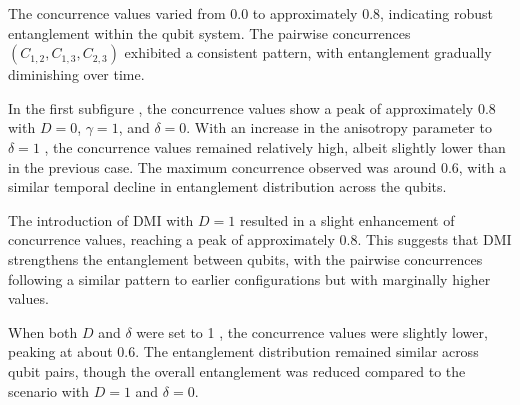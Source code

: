 The concurrence values varied from 0.0 to approximately 0.8, indicating robust entanglement within the qubit system. 
The pairwise concurrences \( (C_{1,2}, C_{1,3}, C_{2,3}) \) exhibited a consistent pattern, with entanglement gradually 
diminishing over time.

In the first subfigure , the concurrence values show a peak of approximately 0.8 with \( D = 0 \), \( \gamma = 1 \), and \( \delta = 0 \). With an increase in the anisotropy parameter to \( \delta = 1 \) , 
the concurrence values remained relatively high, albeit slightly lower than in the previous case. The maximum concurrence observed 
was around 0.6, with a similar temporal decline in entanglement distribution across the qubits.

The introduction of DMI with \( D = 1 \)  resulted in a slight enhancement of concurrence values, reaching a peak of 
approximately 0.8. This suggests that DMI strengthens the entanglement between qubits, with the pairwise concurrences following a similar pattern 
to earlier configurations but with marginally higher values.

When both \( D \) and \( \delta \) were set to 1 , the concurrence values were slightly lower, 
peaking at about 0.6. The entanglement distribution remained similar across qubit pairs, 
though the overall entanglement was reduced compared to 
the scenario with \( D = 1 \) and \( \delta = 0 \).


